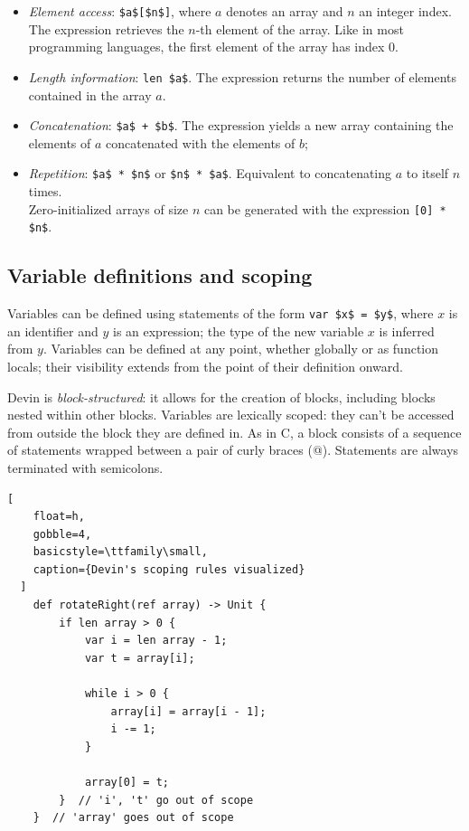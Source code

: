 \documentclass[UdineBachThesis,american,11pt]{PhdThesis}
\begin{document}
  \begin{itemize}
    \item \emph{Element access}: \lstinline[mathescape]@$a$[$n$]@, where $a$
    denotes an array and $n$ an integer index. The expression retrieves the
    $n$-th element of the array. Like in most programming languages, the first
    element of the array has index $0$.

    \item \emph{Length information}: \lstinline[mathescape]@len $a$@. The
    expression returns the number of elements contained in the array $a$.

    \item \emph{Concatenation}: \lstinline[mathescape]@$a$ + $b$@. The
    expression yields a new array containing the elements of $a$ concatenated
    with the elements of $b$;

    \item \emph{Repetition}: \lstinline[mathescape]@$a$ * $n$@ or
    \lstinline[mathescape]@$n$ * $a$@. Equivalent to concatenating $a$ to itself
    $n$ times. \\
    Zero-initialized arrays of size $n$ can be generated with the expression
    \lstinline[mathescape]@[0] * $n$@.
  \end{itemize}

  \subsection{Variable definitions and scoping}

  Variables can be defined using statements of the form
  \lstinline[mathescape]@var $x$ = $y$@, where $x$ is an identifier and $y$ is
  an expression; the type of the new variable $x$ is inferred from $y$.
  Variables can be defined at any point, whether globally or as function locals;
  their visibility extends from the point of their definition onward.

  Devin is \emph{block-structured}: it allows for the creation of blocks,
  including blocks nested within other blocks. Variables are lexically scoped:
  they can't be accessed from outside the block they are defined in. As in C, a
  block consists of a sequence of statements wrapped between a pair of curly
  braces (@). Statements are always terminated with
  semicolons.

  \begin{lstlisting}[
    float=h,
    gobble=4,
    basicstyle=\ttfamily\small,
    caption={Devin's scoping rules visualized}
  ]
    def rotateRight(ref array) -> Unit {
        if len array > 0 {
            var i = len array - 1;
            var t = array[i];

            while i > 0 {
                array[i] = array[i - 1];
                i -= 1;
            }

            array[0] = t;
        }  // 'i', 't' go out of scope
    }  // 'array' goes out of scope
  \end{lstlisting}
\end{document}
